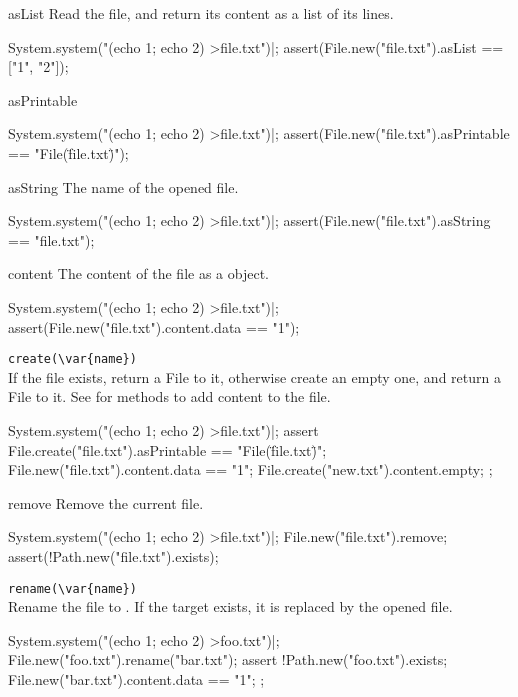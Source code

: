 \begin{urbiscriptapi}
\item[asList]
  Read the file, and return its content as a list of its lines.
\begin{urbiscript}
System.system("(echo 1; echo 2) >file.txt")|;
assert(File.new("file.txt").asList == ["1", "2"]);
\end{urbiscript}

\item[asPrintable]
\begin{urbiscript}
System.system("(echo 1; echo 2) >file.txt")|;
assert(File.new("file.txt").asPrintable == "File(\"file.txt\")");
\end{urbiscript}

\item[asString]
  The name of the opened file.
\begin{urbiscript}
System.system("(echo 1; echo 2) >file.txt")|;
assert(File.new("file.txt").asString == "file.txt");
\end{urbiscript}

\item[content]
  The content of the file as a  object.
\begin{urbiscript}
System.system("(echo 1; echo 2) >file.txt")|;
assert(File.new("file.txt").content.data == "1\n");
\end{urbiscript}

\item \lstinline|create(\var{name})|\\
  If the file  exists, return a File to it, otherwise create
  an empty one, and return a File to it.  See 
  for methods to add content to the file.
\begin{urbiscript}
System.system("(echo 1; echo 2) >file.txt")|;
assert
{
  File.create("file.txt").asPrintable == "File(\"file.txt\")";
  File.new("file.txt").content.data == "1\n";
  File.create("new.txt").content.empty;
};
\end{urbiscript}

\item[remove]
  Remove the current file.
\begin{urbiscript}
System.system("(echo 1; echo 2) >file.txt")|;
File.new("file.txt").remove;
assert(!Path.new("file.txt").exists);
\end{urbiscript}

\item \lstinline|rename(\var{name})|\\
  Rename the file to .  If the target exists, it is replaced by
  the opened file.
\begin{urbiscript}
System.system("(echo 1; echo 2) >foo.txt")|;
File.new("foo.txt").rename("bar.txt");
assert
{
  !Path.new("foo.txt").exists;
  File.new("bar.txt").content.data == "1\n";
};
\end{urbiscript}


\end{urbiscriptapi}


